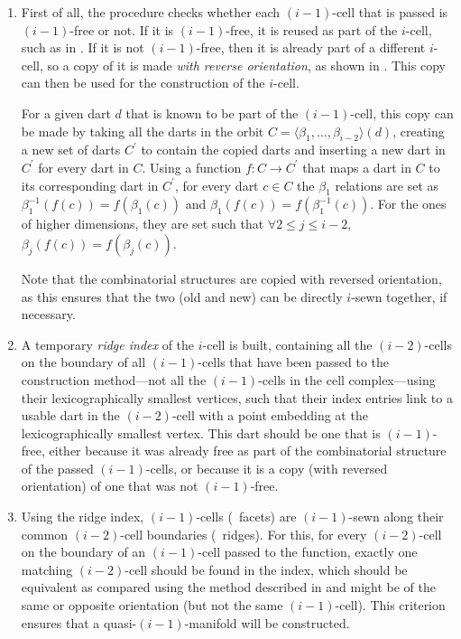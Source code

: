 \begin{enumerate}

\item
First of all, the procedure checks whether each $(i-1)$-cell that is passed is $(i-1)$-free or not.
If it is $(i-1)$-free, it is reused as part of the $i$-cell, such as in .
If it is not $(i-1)$-free, then it is already part of a different $i$-cell, so a copy of it is made \emph{with reverse orientation}, as shown in .
This copy can then be used for the construction of the $i$-cell.

For a given dart $d$ that is known to be part of the $(i-1)$-cell, this copy can be made by taking all the darts in the orbit $C = \langle \beta_1, \ldots, \beta_{i-2} \rangle (d)$, creating a new set of darts $C^\prime$ to contain the copied darts and inserting a new dart in $C^\prime$ for every dart in $C$.
Using a function $f : C \rightarrow C^\prime$ that maps a dart in $C$ to its corresponding dart in $C^\prime$, for every dart $c \in C$ the $\beta_1$ relations are set as $\beta_1^{-1}\left(f\left(c\right)\right) = f\left(\beta_1\left(c\right)\right)$ and $\beta_1\left(f\left(c\right)\right) = f\left(\beta_1^{-1}\left(c\right)\right)$. For the ones of higher dimensions, they are set such that $\forall 2 \leq j \leq i-2$, $\beta_j\left(f\left(c\right)\right) = f\left(\beta_j\left(c\right)\right)$.

Note that the combinatorial structures are copied with reversed orientation, as this ensures that the two (old and new) can be directly $i$-sewn together, if necessary.

\item
A temporary \emph{ridge index} of the $i$-cell is built, containing all the $(i-2)$-cells on the boundary of all $(i-1)$-cells that have been passed to the construction method---not all the $(i-1)$-cells in the cell complex---using their lexicographically smallest vertices, such that their index entries link to a usable dart in the $(i-2)$-cell with a point embedding at the lexicographically smallest vertex.
This dart should be one that is $(i-1)$-free, either because it was already free as part of the combinatorial structure of the passed $(i-1)$-cells, or because it is a copy (with reversed orientation) of one that was not $(i-1)$-free.

\item
Using the ridge index, $(i-1)$-cells (\ie\ facets) are $(i-1)$-sewn along their common $(i-2)$-cell boundaries (\ie\ ridges).
For this, for every $(i-2)$-cell on the boundary of an $(i-1)$-cell passed to the function, exactly one matching $(i-2)$-cell should be found in the index, which should be equivalent as compared using the method described in  and might be of the same or opposite orientation (but not the same $(i-1)$-cell).
This criterion ensures that a quasi-$(i-1)$-manifold will be constructed.


\end{enumerate}
